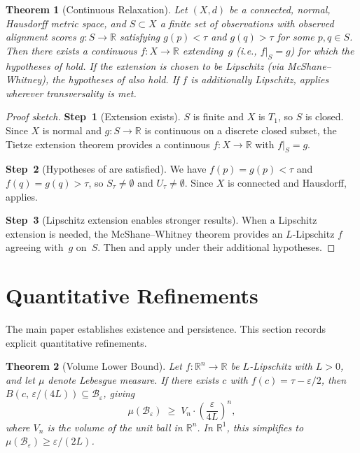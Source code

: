 \documentclass[11pt]{article}
\newtheorem{theorem}{Theorem}[section]
\newcommand{\R}{\mathbb{R}}
\begin{document}
\begin{theorem}[Continuous Relaxation]
\label{thm:tietze}
Let $(X,d)$ be a connected, normal, Hausdorff metric space, and
$S \subset X$ a finite set of observations with observed alignment
scores $g\colon S \to \R$ satisfying $g(p) < \tau$ and $g(q) > \tau$
for some $p, q \in S$. Then there exists a continuous $f\colon X \to \R$
extending~$g$ (i.e., $f|_S = g$) for which the hypotheses of
 hold. If the extension is chosen to be Lipschitz
(via McShane--Whitney), the hypotheses of  also
hold. If $f$ is additionally Lipschitz,  applies
wherever transversality is met.
\end{theorem}

\begin{proof}[Proof sketch]
\textbf{Step~1} (Extension exists).
$S$ is finite and $X$ is $T_1$, so $S$ is closed. Since $X$ is normal
and $g\colon S \to \R$ is continuous on a discrete closed subset, the
Tietze extension theorem provides a continuous
$f\colon X \to \R$ with $f|_S = g$.

\textbf{Step~2} (Hypotheses of  are satisfied).
We have $f(p) = g(p) < \tau$ and $f(q) = g(q) > \tau$, so
$S_\tau \neq \emptyset$ and $U_\tau \neq \emptyset$. Since $X$ is
connected and Hausdorff,  applies.

\textbf{Step~3} (Lipschitz extension enables stronger results).
When a Lipschitz extension is needed, the McShane--Whitney theorem
provides an $L$-Lipschitz $f$ agreeing with~$g$ on~$S$. Then
 and  apply under their
additional hypotheses.
\end{proof}

\section{Quantitative Refinements}
\label{app:quantitative}

The main paper establishes existence and persistence. This section
records explicit quantitative refinements.

\begin{theorem}[Volume Lower Bound]
\label{thm:coarea}
Let $f\colon \R^n \to \R$ be $L$-Lipschitz with $L > 0$, and let
$\mu$ denote Lebesgue measure. If there exists $c$ with
$f(c) = \tau - \varepsilon/2$, then
$B(c,\, \varepsilon/(4L)) \subseteq
\mathcal{B}_\varepsilon$, giving
\[
  \mu(\mathcal{B}_\varepsilon)
  \;\geq\; V_n \cdot \left(\frac{\varepsilon}{4L}\right)^{\!n},
\]
where $V_n$ is the volume of the unit ball in $\R^n$. In $\R^1$,
this simplifies to $\mu(\mathcal{B}_\varepsilon) \geq \varepsilon/(2L)$.
\end{theorem}
\end{document}
